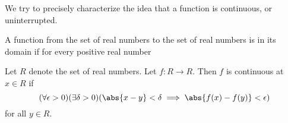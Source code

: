 
\sbasic













\sstart
{}


We try to precisely
characterize the idea
that a function is
continuous, or uninterrupted.


A function from the set of real
numbers to the set of real numbers
is 
in its domain if for every positive
real number


Let $R$ denote the set of real numbers.
Let $f: R \to R$. Then $f$ is continuous
at $x \in R$ if
\[
  (\forall \epsilon > 0)(\exists \delta > 0)(\abs{x - y} < \delta \implies \abs{f(x) - f(y)} < \epsilon)
\]
for all $y \in R$.

\strats
